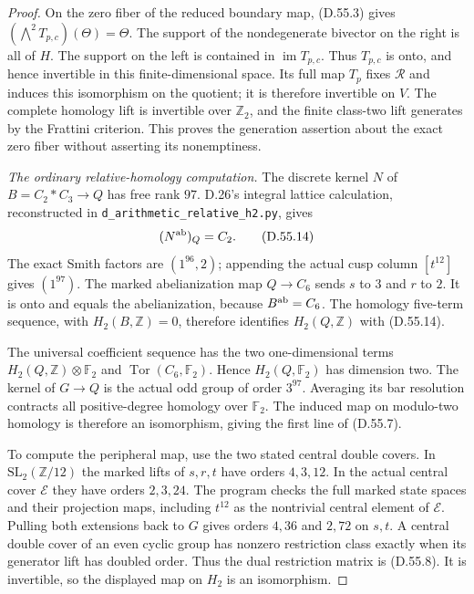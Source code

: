 \begin{proof}
On the zero fiber of the reduced
boundary map, (D.55.3) gives
\((\bigwedge^2T_{p,c})(\Theta)=\Theta\).
The support of the nondegenerate
bivector on the right is all of
\(H\). The support on the left is
contained in \(\operatorname{im}T_{p,c}\).
Thus \(T_{p,c}\) is onto, and hence
invertible in this finite-dimensional
space. Its full map \(T_p\) fixes
\(\mathcal R\) and induces this
isomorphism on the quotient; it is
therefore invertible on \(V\).
The complete homology lift is
invertible over \(\mathbb Z_2\),
and the finite class-two lift
generates by the Frattini criterion.
This proves the generation assertion
about the exact zero fiber without
asserting its nonemptiness.

\emph{The ordinary relative-homology computation.}
The discrete kernel \(N\) of
\(B=C_2*C_3\to Q\) has free rank \(97\).
D.26's integral lattice calculation,
reconstructed in
\texttt{d\_arithmetic\_\allowbreak{}relative\_h2.py},
gives
\[
                    (N^{\rm ab})_Q=C_2 .
 \tag{D.55.14}
\]
The exact Smith factors are
\((1^{96},2)\); appending the
actual cusp column \([t^{12}]\)
gives \((1^{97})\).
The marked abelianization map
\(Q\to C_6\) sends \(s\) to \(3\)
and \(r\) to \(2\). It is onto
and equals the abelianization,
because \(B^{\rm ab}=C_6\).
The homology five-term sequence,
with \(H_2(B,\mathbb Z)=0\),
therefore identifies \(H_2(Q,\mathbb Z)\)
with (D.55.14).

The universal coefficient sequence
has the two one-dimensional terms
\(H_2(Q,\mathbb Z)\otimes\mathbb F_2\)
and \(\operatorname{Tor}(C_6,\mathbb F_2)\).
Hence \(H_2(Q,\mathbb F_2)\)
has dimension two. The kernel of
\(G\to Q\) is the actual odd group
of order \(3^{97}\). Averaging its
bar resolution contracts all
positive-degree homology over
\(\mathbb F_2\). The induced map
on modulo-two homology is therefore
an isomorphism, giving the first
line of (D.55.7).

To compute the peripheral map,
use the two stated central double
covers. In \(\mathrm{SL}_2(\mathbb Z/12)\)
the marked lifts of \(s,r,t\)
have orders \(4,3,12\). In the
actual central cover \(\mathcal E\)
they have orders \(2,3,24\).
The program checks the full marked
state spaces and their projection
maps, including \(t^{12}\) as the
nontrivial central element of
\(\mathcal E\).
Pulling both extensions back to
\(G\) gives orders \(4,36\)
and \(2,72\) on \(s,t\).
A central double cover of an
even cyclic group has nonzero
restriction class exactly when
its generator lift has doubled
order. Thus the dual restriction
matrix is (D.55.8). It is invertible,
so the displayed map on \(H_2\)
is an isomorphism.


\end{proof}
